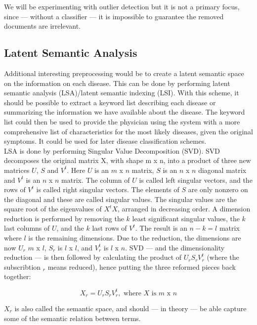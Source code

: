   We will be
experimenting with outlier detection but it is not a primary focus,
since --- without a classifier --- it is impossible to guarantee the
removed documents are irrelevant.

\subsection{Latent Semantic Analysis\label{LSA}}

Additional interesting preprocessing would be to create a latent
semantic space on the information on each disease. This can be done by
performing latent semantic analysis (LSA)/latent semantic indexing
(LSI). With this scheme, it should be possible to extract a keyword
list describing each disease or summarizing the information we have
available about the disease. The keyword list could then be used to
provide the physician using the system with a more comprehensive list
of characteristics for the most likely diseases, given the original
symptoms. It could be used for later disease classification schemes. \\

LSA is done by performing Singular Value Decomposition (SVD). SVD
decomposes the original matrix X, with shape m x n, into a product of
three new matrices $U$, $S$ and $V^{t}$. Here $U$ is an $m$ x $n$ matrix, $S$ is
an $n$ x $n$ diagonal matrix and $V^{t}$ is an $n$ x $n$ matrix. The column of
$U$ is called left singular vectors, and the rows of $V^{t}$ is called
right singular vectors. The elements of $S$ are only nonzero on the
diagonal and these are called singular values. The singular values are
the square root of the eigenvalues of $X^{t}X$, arranged in decreasing
order. A dimension reduction is performed by removing the $k$ least
significant singular values, the $k$ last columns of $U$, and the $k$ last
rows of $V^{t}$. The result is an $n - k = l$ matrix where $l$ is the
remaining dimensions. Due to the reduction, the dimensions are now
$U_{r}$ $m$ x $l$, $S_{r}$ is $l$ x $l$, and $V_{r}^{t}$ is $l$ x $n$. SVD --- and the
dimensionality reduction --- is then followed by calculating the product
of $U_{r}S_{r}V_{r}^{t}$ (where the subscribtion $_{r}$ means reduced),
hence putting the three reformed pieces back together: 

\[
X_{r} = U_{r}S_{r}V_{r}^{t}, \textrm{ where } X \textrm{ is } m \textrm{ x }n
\]

$X_{r}$ is also called the semantic space, and should --- in theory --- be
able capture some of the semantic relation between terms.

